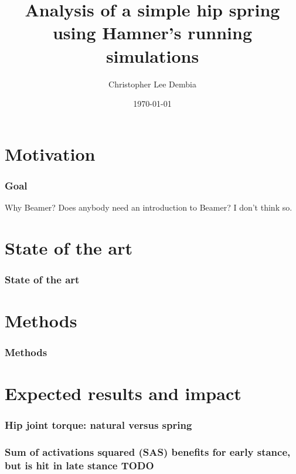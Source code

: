 \documentclass[
]{beamer}
\title[Hip Spring]
    {Analysis of a simple hip spring using Hamner's running simulations}
\author{Christopher Lee Dembia}
\institute[Stanford]
{
    Neuromuscular Biomechanics Lab \\
    Stanford University \\
}
\date{\today}
\begin{document}
\begin{frame}
    \begin{comment}
    TODO big representative picture.
    \end{comment}
\titlepage
\end{frame}

\section{Motivation}
\begin{frame}
\frametitle{Goal}
\begin{block}
{Why Beamer?}
Does anybody need an introduction to Beamer? I don't think so.
\end{block}
\end{frame}

\section{State of the art}
\begin{frame}
    \frametitle{State of the art}
\end{frame}

\section{Methods}
\begin{frame}
    \frametitle{Methods}
\end{frame}

\section{Expected results and impact}

\begin{frame}
    \frametitle{Hip joint torque: natural versus spring}
\end{frame}

\begin{frame}
    \begin{comment}
    Sum of activations squared versus percent gait cycle

    show a sample of 4 or 6 gait cycles.
    \end{comment}

    \frametitle{Sum of activations squared (SAS) benefits for early stance, but
    is hit in late stance TODO}
\end{frame}
\end{document}
